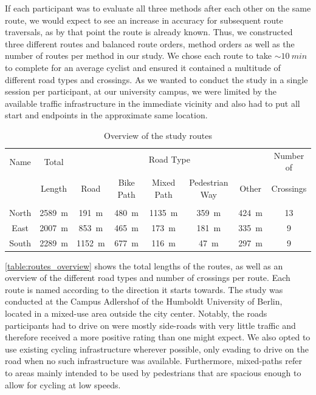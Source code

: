 If each participant was to evaluate all three methods after each other on the same route, we would expect to see an increase in accuracy for subsequent route traversals, as by that point the route is already known.
Thus, we constructed three different routes and balanced route orders, method orders as well as the number of routes per method in our study.
We chose each route to take $\sim\SI{10}{min}$ to complete for an average cyclist and ensured it contained a multitude of different road types and crossings.
As we wanted to conduct the study in a single session per participant, at our university campus, we were limited by the available traffic infrastructure in the immediate vicinity and also had to put all start and endpoints in the approximate same location.

\begin{table}[!htb]
    \footnotesize
    \centering
    \begin{tabular}{c|c|ccccc|c}
        \multirow{2}{*}{Name} & \multirow{2}{2.4em}{Total\newline} & \multicolumn{5}{c|}{Road Type} & \multirow{2}{4.7em}{Number of\newline}\\
        \cline{3-7}
        &&&&&&&\\[-1em]
        & Length & Road & Bike Path & Mixed Path & Pedestrian Way & Other & Crossings\\[0.15em]
        \hline
        &&&&&&&\\[-0.8em]
        North & \SI{2589}{m} &  \SI{191}{m} & \SI{480}{m} & \SI{1135}{m} & \SI{359}{m} & \SI{424}{m} & 13\\[0.3em]
        East  & \SI{2007}{m} &  \SI{853}{m} & \SI{465}{m} &  \SI{173}{m} & \SI{181}{m} & \SI{335}{m} & 9\\[0.3em]
        South & \SI{2289}{m} & \SI{1152}{m} & \SI{677}{m} &  \SI{116}{m} &  \SI{47}{m} & \SI{297}{m} & 9\\
    \end{tabular}
    \caption{Overview of the study routes}
    \label{table:routes_overview}
\end{table}

\noindent
\autoref{table:routes_overview} shows the total lengths of the routes, as well as an overview of the different road types and number of crossings per route.
Each route is named according to the direction it starts towards.
The study was conducted at the Campus Adlershof of the Humboldt University of Berlin, located in a mixed-use area outside the city center.
Notably, the roads participants had to drive on were mostly side-roads with very little traffic and therefore received a more positive rating than one might expect.
We also opted to use existing cycling infrastructure wherever possible, only evading to drive on the road when no such infrastructure was available.
Furthermore, mixed-paths refer to areas mainly intended to be used by pedestrians that are spacious enough to allow for cycling at low speeds.

